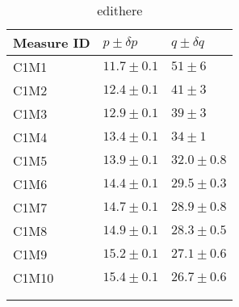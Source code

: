 \begin{longtable}{@{}lll@{}}
\toprule
Measure ID & $p \pm \delta p$ & $q \pm \delta q$ \tabularnewline
\midrule
C1M1 & $11.7 \pm 0.1$ & $51 \pm 6$ \tabularnewline
C1M2 & $12.4 \pm 0.1$ & $41 \pm 3$ \tabularnewline
C1M3 & $12.9 \pm 0.1$ & $39 \pm 3$ \tabularnewline
C1M4 & $13.4 \pm 0.1$ & $34 \pm 1$ \tabularnewline
C1M5 & $13.9 \pm 0.1$ & $32.0 \pm 0.8$ \tabularnewline
C1M6 & $14.4 \pm 0.1$ & $29.5 \pm 0.3$ \tabularnewline
C1M7 & $14.7 \pm 0.1$ & $28.9 \pm 0.8$ \tabularnewline
C1M8 & $14.9 \pm 0.1$ & $28.3 \pm 0.5$ \tabularnewline
C1M9 & $15.2 \pm 0.1$ & $27.1 \pm 0.6$ \tabularnewline
C1M10 & $15.4 \pm 0.1$ & $26.7 \pm 0.6$ \tabularnewline
\bottomrule
\label{tab:edithere}
\\
\caption{edithere}
\end{longtable}
